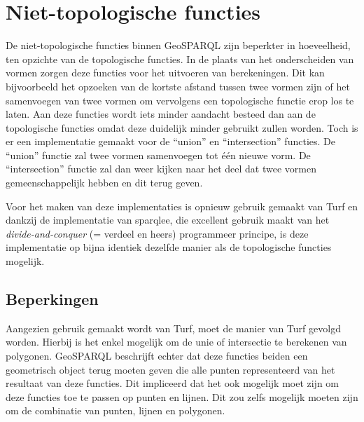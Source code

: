 \section{Niet-topologische functies}
\label{sec:niet_topologische_functies}
De niet-topologische functies binnen GeoSPARQL zijn beperkter in hoeveelheid, ten opzichte van de topologische functies. In de plaats van het onderscheiden van vormen zorgen deze functies voor het uitvoeren van berekeningen. Dit kan bijvoorbeeld het opzoeken van de kortste afstand tussen twee vormen zijn of het samenvoegen van twee vormen om vervolgens een topologische functie erop los te laten. Aan deze functies wordt iets minder aandacht besteed dan aan de topologische functies omdat deze duidelijk minder gebruikt zullen worden. Toch is er een implementatie gemaakt voor de ``union'' en ``intersection'' functies. De ``union'' functie zal twee vormen samenvoegen tot één nieuwe vorm. De ``intersection'' functie zal dan weer kijken naar het deel dat twee vormen gemeenschappelijk hebben en dit terug geven. 

Voor het maken van deze implementaties is opnieuw gebruik gemaakt van Turf en dankzij de implementatie van sparqlee, die excellent gebruik maakt van het \textit{divide-and-conquer} (= verdeel en heers) programmeer principe, is deze implementatie op bijna identiek dezelfde manier als de topologische functies mogelijk.

\subsection{Beperkingen}
Aangezien gebruik gemaakt wordt van Turf, moet de manier van Turf gevolgd worden. Hierbij is het enkel mogelijk om de unie of intersectie te berekenen van polygonen. GeoSPARQL beschrijft echter dat deze functies beiden een geometrisch object terug moeten geven die alle punten representeerd van het resultaat van deze functies. Dit impliceerd dat het ook mogelijk moet zijn om deze functies toe te passen op punten en lijnen. Dit zou zelfs mogelijk moeten zijn om de combinatie van punten, lijnen en polygonen.

